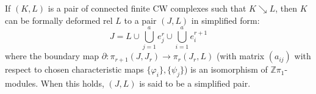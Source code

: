 If $(K, L)$ is a pair of connected finite CW complexes such that $K \searrow L$, then $K$ can be formally deformed rel $L$ to a pair $(J, L)$ in simplified form:
$$J = L \cup \bigcup_{j=1}^a e_j^r \cup \bigcup_{i=1}^a e_i^{r+1}$$
where the boundary map $\partial: \pi_{r+1}(J, J_r) \rightarrow \pi_r(J_r, L)$ (with matrix $(a_{ij})$ with respect to chosen characteristic maps $\{\varphi_i\}, \{\psi_j\}$) is an isomorphism of $\mathbb{Z}\pi_1$-modules. When this holds, $(J, L)$ is said to be a simplified pair.
